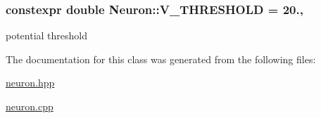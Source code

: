 \hypertarget{classNeuron_afe5838f934fbc7e8ba549986e0a6ef90}{
\subsubsection[{V\-\_\-\-T\-H\-R\-E\-S\-H\-O\-L\-D}]{\setlength{\rightskip}{0pt plus 5cm}constexpr double Neuron\-::\-V\-\_\-\-T\-H\-R\-E\-S\-H\-O\-L\-D = 20.\hspace{0.3cm}{\ttfamily [static]}, {\ttfamily [private]}}}\label{classNeuron_afe5838f934fbc7e8ba549986e0a6ef90}


potential threshold 



The documentation for this class was generated from the following files\-:\begin{DoxyCompactItemize}
\item 
\hyperlink{neuron_8hpp}{neuron.\-hpp}\item 
\hyperlink{neuron_8cpp}{neuron.\-cpp}\end{DoxyCompactItemize}
